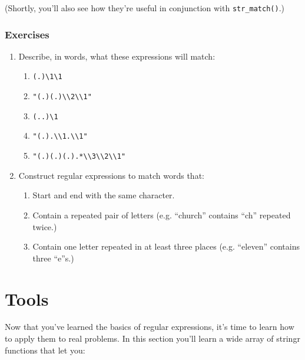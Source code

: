 \documentclass[]{book}
\providecommand{\tightlist}{%
  \setlength{\itemsep}{0pt}\setlength{\parskip}{0pt}}
\begin{document}
(Shortly, you'll also see how they're useful in conjunction with
\texttt{str\_match()}.)

\subsubsection{Exercises}\label{exercises-35}

\begin{enumerate}
\def\labelenumi{\arabic{enumi}.}
\item
  Describe, in words, what these expressions will match:

  \begin{enumerate}
  \def\labelenumii{\arabic{enumii}.}
  \tightlist
  \item
    \texttt{(.)\textbackslash{}1\textbackslash{}1}
  \item
    \texttt{"(.)(.)\textbackslash{}\textbackslash{}2\textbackslash{}\textbackslash{}1"}
  \item
    \texttt{(..)\textbackslash{}1}
  \item
    \texttt{"(.).\textbackslash{}\textbackslash{}1.\textbackslash{}\textbackslash{}1"}
  \item
    \texttt{"(.)(.)(.).*\textbackslash{}\textbackslash{}3\textbackslash{}\textbackslash{}2\textbackslash{}\textbackslash{}1"}
  \end{enumerate}
\item
  Construct regular expressions to match words that:

  \begin{enumerate}
  \def\labelenumii{\arabic{enumii}.}
  \item
    Start and end with the same character.
  \item
    Contain a repeated pair of letters (e.g. ``church'' contains ``ch''
    repeated twice.)
  \item
    Contain one letter repeated in at least three places (e.g.
    ``eleven'' contains three ``e''s.)
  \end{enumerate}
\end{enumerate}

\section{Tools}\label{tools}

Now that you've learned the basics of regular expressions, it's time to
learn how to apply them to real problems. In this section you'll learn a
wide array of stringr functions that let you:
\end{document}
